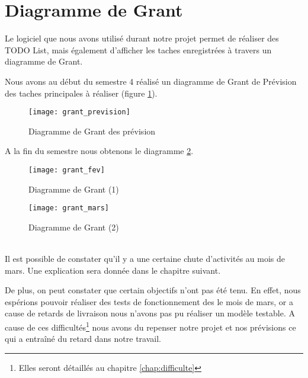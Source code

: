 \section{Diagramme de Grant}

Le logiciel que nous avons utilisé durant notre projet permet de réaliser des TODO List, mais également d'afficher les taches enregistrées à travers un diagramme de Grant.

Nous avons au début du semestre 4 réalisé un diagramme de Grant de Prévision des taches principales à réaliser (figure \ref{fig:grant_pre}).

\begin{figure}[h]
  \centering
  \texttt{[image: grant\_prevision]}
  \caption{Diagramme de Grant des prévision}
  \label{fig:grant_pre}
\end{figure}


A la fin du semestre nous obtenons le diagramme  \ref{fig:grant_fev}.
\begin{figure}[h]
  \centering
  \texttt{[image: grant\_fev]}
  \caption{Diagramme de Grant (1)}
  \label{fig:grant_fev}
\end{figure}
\begin{figure}[h]
  \centering
  \texttt{[image: grant\_mars]}
  \caption{Diagramme de Grant (2)}
  \label{fig:grant_mars}
\end{figure}

~\\
Il est possible de constater qu'il y a une certaine chute d'activités au mois de mars. Une explication sera donnée dans le chapitre suivant.

De plus, on peut constater que certain objectifs n'ont pas été tenu. En effet, nous espérions pouvoir réaliser des tests de fonctionnement des le mois de mars, or a cause de retards de livraison nous n'avons pas pu réaliser un modèle testable. A cause de ces difficultés\footnote{Elles seront détaillés au chapitre \ref{chap:difficulte}} nous avons du repenser notre projet et nos prévisions ce qui a entraîné du retard dans notre travail.


